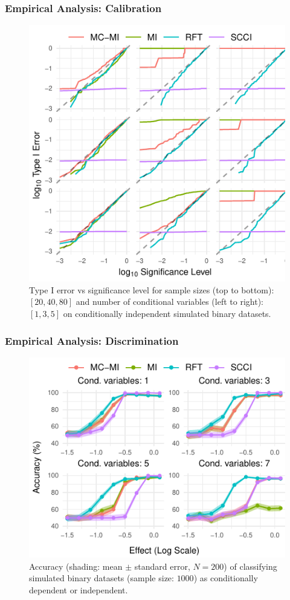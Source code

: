 \documentclass{beamer}
\begin{document}
\begin{frame}
	\frametitle{Empirical Analysis: Calibration}
	\begin{figure}
		\centering
		\includegraphics[scale=0.8]{imgs/calibration_add_vars.pdf}
		\caption{Type I error vs significance level for sample sizes (top to
		bottom): $ [20, 40, 80] $ and number of conditional variables (left to
		right): $ [1, 3, 5] $ on conditionally independent simulated binary
		datasets.}
	\end{figure}
\end{frame}

\begin{frame}
	\frametitle{Empirical Analysis: Discrimination}
	\begin{figure}
		\centering
		\includegraphics{imgs/accuracy.pdf}
		\caption{Accuracy (shading: mean $\pm$ standard error, $N=200$)
		of classifying simulated binary datasets (sample size: $1000$)
		as conditionally dependent or independent.}
	\end{figure}
\end{frame}
\end{document}
